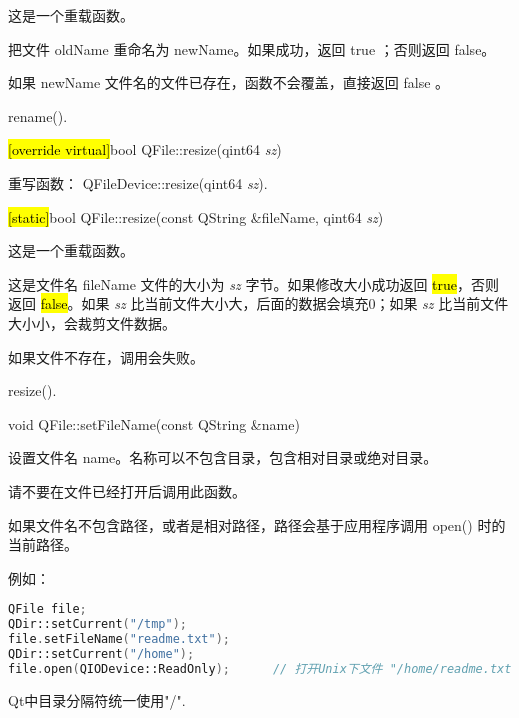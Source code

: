这是一个重载函数。

把文件 oldName 重命名为 newName。如果成功，返回 true ；否则返回 false。


\begin{notice}
如果 newName 文件名的文件已存在，函数不会覆盖，直接返回 false 。
\end{notice}



\begin{notice}[另请参阅]
rename().
\end{notice}

\hl{[override virtual]}bool QFile::resize(qint64 \emph{sz})

重写函数： QFileDevice::resize(qint64 \emph{sz}).

\hl{[static]}bool QFile::resize(const QString \&fileName, qint64 \emph{sz})

这是一个重载函数。

这是文件名 fileName 文件的大小为 \emph{sz} 字节。如果修改大小成功返回 \hl{true}，否则返回 \hl{false}。如果 \emph{sz} 比当前文件大小大，后面的数据会填充0；如果 \emph{sz} 比当前文件大小小，会裁剪文件数据。



\begin{notice}[警告]
如果文件不存在，调用会失败。
\end{notice}

\begin{notice}[另请参阅]
resize().
\end{notice}

void QFile::setFileName(const QString \&name)

设置文件名 name。名称可以不包含目录，包含相对目录或绝对目录。

请不要在文件已经打开后调用此函数。

如果文件名不包含路径，或者是相对路径，路径会基于应用程序调用 open() 时的当前路径。

例如：

\begin{lstlisting}[language=C++]
QFile file;
QDir::setCurrent("/tmp");
file.setFileName("readme.txt");
QDir::setCurrent("/home");
file.open(QIODevice::ReadOnly);      // 打开Unix下文件 "/home/readme.txt"
\end{lstlisting}



\begin{notice}
Qt中目录分隔符统一使用"/".
\end{notice}

